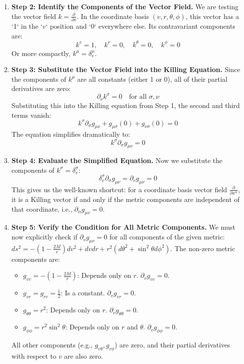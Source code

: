 \begin{solution}
\begin{enumerate}
    \item \textbf{Step 2: Identify the Components of the Vector Field.}
    We are testing the vector field $k = \frac{\partial}{\partial v}$. In the coordinate basis $(v, r, \theta, \phi)$, this vector has a `1` in the `$v$` position and `0` everywhere else. Its contravariant components are:
    \[ k^v = 1, \quad k^r = 0, \quad k^\theta = 0, \quad k^\phi = 0 \]
    Or more compactly, $k^\mu = \delta^\mu_v$.

    \item \textbf{Step 3: Substitute the Vector Field into the Killing Equation.}
    Since the components of $k^\mu$ are all constants (either 1 or 0), all of their partial derivatives are zero:
    \[ \partial_\nu k^\sigma = 0 \quad \text{for all } \sigma, \nu \]
    Substituting this into the Killing equation from Step 1, the second and third terms vanish:
    \[ k^\sigma \partial_\sigma g_{\mu\nu} + g_{\mu\sigma} (0) + g_{\nu\sigma} (0) = 0 \]
    The equation simplifies dramatically to:
    \[ k^\sigma \partial_\sigma g_{\mu\nu} = 0 \]

    \item \textbf{Step 4: Evaluate the Simplified Equation.}
    Now we substitute the components of $k^\sigma = \delta^\sigma_v$:
    \[ \delta^\sigma_v \partial_\sigma g_{\mu\nu} = \partial_v g_{\mu\nu} = 0 \]
    This gives us the well-known shortcut: for a coordinate basis vector field $\frac{\partial}{\partial x^\alpha}$, it is a Killing vector if and only if the metric components are independent of that coordinate, i.e., $\partial_\alpha g_{\mu\nu} = 0$.

    \item \textbf{Step 5: Verify the Condition for All Metric Components.}
    We must now explicitly check if $\partial_v g_{\mu\nu} = 0$ for all components of the given metric:
    $ds^2 = -(1 - \frac{2M}{r}) dv^2 + dv dr + r^2 (d\theta^2 + \sin^2\theta d\phi^2)$.
    The non-zero metric components are:
    \begin{itemize}
        \item $g_{vv} = -(1 - \frac{2M}{r})$: Depends only on $r$. $\partial_v g_{vv} = 0$.
        \item $g_{vr} = g_{rv} = \frac{1}{2}$: Is a constant. $\partial_v g_{vr} = 0$.
        \item $g_{\theta\theta} = r^2$: Depends only on $r$. $\partial_v g_{\theta\theta} = 0$.
        \item $g_{\phi\phi} = r^2\sin^2\theta$: Depends only on $r$ and $\theta$. $\partial_v g_{\phi\phi} = 0$.
    \end{itemize}
    All other components (e.g., $g_{v\theta}, g_{r\phi}$) are zero, and their partial derivatives with respect to $v$ are also zero.
    

\end{enumerate}
\end{solution}
